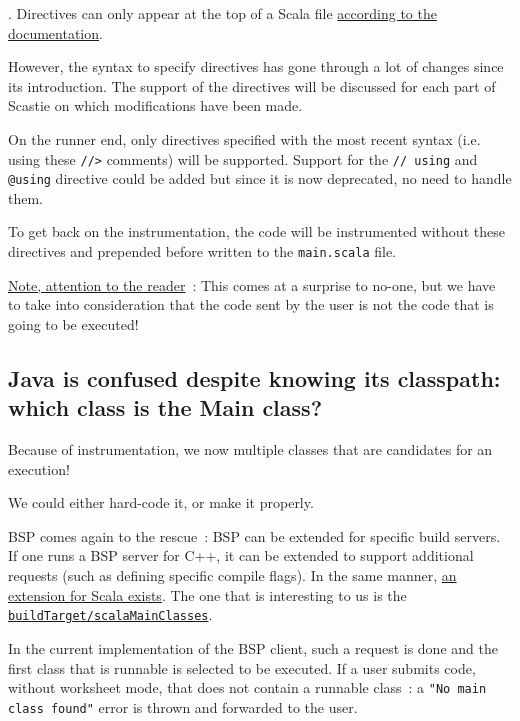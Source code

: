 \documentclass{article}
\begin{document}
. Directives can only appear at the top of a Scala file \href{https://scala-cli.virtuslab.org/docs/guides/using-directives#semantics}{according to the documentation}. 

However, the syntax to specify directives has gone through a lot of changes since its introduction. The support of the directives will be discussed for each part of Scastie on which modifications have been made.

On the runner end, only directives specified with the most recent syntax (i.e. using these \lstinline{//>} comments) will be supported. Support for the \lstinline{// using} and \lstinline{@using} directive could be added but since it is now deprecated, no need to handle them.

To get back on the instrumentation, the code will be instrumented without these directives and prepended before written to the \lstinline{main.scala} file.

\underline{Note, attention to the reader}~: This comes at a surprise to no-one, but we have to take into consideration that the code sent by the user is not the code that is going to be executed! 

\subsection{Java is confused despite knowing its classpath: which class is the Main class?}

Because of instrumentation, we now multiple classes that are candidates for an execution!

We could either hard-code it, or make it properly.

BSP comes again to the rescue~: BSP can be extended for specific build servers. If one runs a BSP server for C++, it can be extended to support additional requests (such as defining specific compile flags). In the same manner, \href{https://build-server-protocol.github.io/docs/extensions/scala}{an extension for Scala exists}. The one that is interesting to us is the \href{https://build-server-protocol.github.io/docs/extensions/scala#scala-main-classes-request}{\lstinline{buildTarget/scalaMainClasses}}.

In the current implementation of the BSP client, such a request is done and the first class that is runnable is selected to be executed. If a user submits code, without worksheet mode, that does not contain a runnable class~: a \lstinline{"No main class found"} error is thrown and forwarded to the user.
\end{document}
